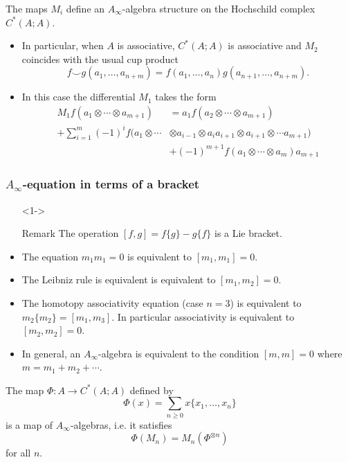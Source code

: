 \documentclass{beamer}
\theoremstyle{definition}
\begin{document}
\begin{frame}
\begin{theorem}[Getzler]
The maps $M_i$ define an $A_\infty$-algebra structure on the Hochschild complex $C^*(A;A)$.
\end{theorem}
\begin{itemize}
\item<2-> In particular, when $A$ is associative, $C^*(A;A)$ is associative and $M_2$ coincides with the usual cup product 
\[f\smile g(a_1,\dots,a_{n+m})=f(a_1,\dots, a_n)g(a_{n+1},\dots, a_{n+m}).\]
\item<3-> In this case the differential $M_1$ takes the form
 \begin{align*}
	 M_1 f(a_1\otimes\cdots\otimes a_{m+1})&=a_1f(a_2\otimes\cdots\otimes a_{m+1})\\
	  +\sum_{i=1}^m(-1)^if(a_1\otimes\cdots&\otimes a_{i-1}\otimes a_ia_{i+1}\otimes a_{i+1}\otimes\cdots a_{m+1})\\
	 & +(-1)^{m+1}f(a_1\otimes\cdots\otimes a_m)a_{m+1}
	 \end{align*}

\end{itemize}
\end{frame}
\begin{frame}
\frametitle{$A_\infty$-equation in terms of a bracket}
\begin{itemize}
\item[]<1->\begin{block}{Remark}
The operation $[f,g]=f\{g\}-g\{f\}$ is a Lie bracket. %
\end{block}
\item<2-> The equation $m_1m_1=0$ is equivalent to $[m_1,m_1]=0$.
\item<3-> The Leibniz rule is equivalent is equivalent to $[m_1,m_2]=0$.
\item<4-> The homotopy associativity equation (case $n=3$) is equivalent to $m_2\{m_2\}=[m_1,m_3]$. In particular associativity is equivalent to $[m_2,m_2]=0$. %
\item<5-> In general, an $A_\infty$-algebra is equivalent to the condition $[m,m]=0$ where $m=m_1+m_2+\cdots$.
\end{itemize}

\end{frame}
\begin{frame}
\begin{theorem}
The map $\Phi:A\to C^*(A;A)$ defined by \[\Phi(x)=\sum_{n\geq 0} x\{x_1,\dots, x_n\}\]
is a map of $A_\infty$-algebras, i.e. it satisfies 
\[\Phi(M_n)=M_n(\Phi^{\otimes n})\]
for all $n$.

\end{theorem}
\end{frame}
\end{document}
